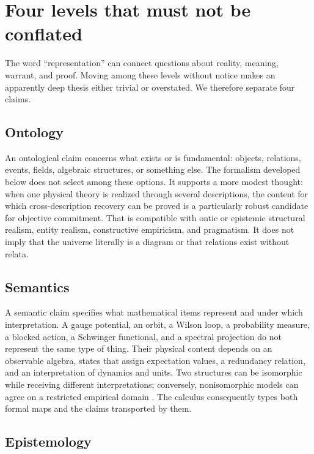 \section{Four levels that must not be conflated}
\label{sec:levels}

The word ``representation'' can connect questions about reality, meaning,
warrant, and proof.  Moving among these levels without notice makes an
apparently deep thesis either trivial or overstated.  We therefore separate
four claims.

\subsection{Ontology}

An ontological claim concerns what exists or is fundamental: objects,
relations, events, fields, algebraic structures, or something else.  The
formalism developed below does not select among these options.  It supports a
more modest thought: when one physical theory is realized through several
descriptions, the content for which cross-description recovery can be proved
is a particularly robust candidate for objective commitment.  That is
compatible with ontic or epistemic structural realism, entity realism,
constructive empiricism, and pragmatism.  It does not imply that the universe
literally is a diagram or that relations exist without relata.

\subsection{Semantics}

A semantic claim specifies what mathematical items represent and under which
interpretation.  A gauge potential, an orbit, a Wilson loop, a probability
measure, a blocked action, a Schwinger functional, and a spectral projection
do not represent the same type of thing.  Their physical content depends on
an observable algebra, states that assign expectation values, a redundancy
relation, and an interpretation of dynamics and units.  Two structures can
be isomorphic while receiving different interpretations; conversely,
nonisomorphic models can agree on a restricted empirical domain
\cite{Coffey2014,DeHaroButterfield2018}.  The calculus consequently types both
formal maps and the claims transported by them.

\subsection{Epistemology}

